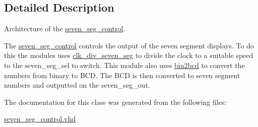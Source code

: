 \subsection{Detailed Description}
Architecture of the \hyperlink{classseven__seg__control}{seven\-\_\-seg\-\_\-control}. 

The \hyperlink{classseven__seg__control}{seven\-\_\-seg\-\_\-control} controls the output of the seven segment displays. To do this the modules uses \hyperlink{classclk__div__seven__seg}{clk\-\_\-div\-\_\-seven\-\_\-seg} to divide the clock to a suitable speed to the seven\-\_\-seg\-\_\-sel to switch. This module also uses \hyperlink{classbin2bcd}{bin2bcd} to convert the numbers from binary to B\-C\-D. The B\-C\-D is then converted to seven segment numbers and outputted on the seven\-\_\-seg\-\_\-out. 

The documentation for this class was generated from the following files\-:\begin{DoxyCompactItemize}
\item 
\hyperlink{seven__seg__control_8vhd}{seven\-\_\-seg\-\_\-control.\-vhd}\end{DoxyCompactItemize}

